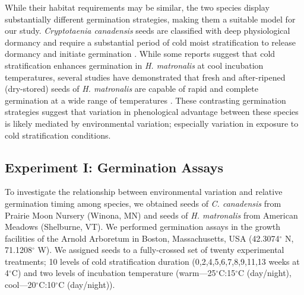 \documentclass{article}[11pt]
\begin{document}
While their habitat requirements may be similar, the two species display substantially different germination strategies, making them a suitable model for our study. \textit{Cryptotaenia canadensis} seeds are classified with deep physiological dormancy and require a substantial period of cold moist stratification to release dormancy and initiate germination \citep{Baskin:1988um}. While some reports suggest that cold stratification enhances germination in \textit{H. matronalis} at cool incubation temperatures, several studies have demonstrated that fresh and after-ripened (dry-stored) seeds of \textit{H. matronalis} are capable of rapid and complete germination at a wide range of temperatures \citep{Susko:2008ut}. These contrasting germination strategies suggest that variation in phenological advantage between these species is likely mediated by environmental variation; especially variation in exposure to cold stratification conditions.

\subsection*{Experiment I: Germination Assays}
To investigate the relationship between environmental variation and relative germination timing among species, we obtained seeds of \textit{C. canadensis} from Prairie Moon Nursery (Winona, MN) and seeds of \textit{H. matronalis} from American Meadows (Shelburne, VT). We performed germination assays in the growth facilities of the Arnold Arboretum in Boston, Massachusetts, USA (42.3074$^{\circ}$ N, 71.1208$^{\circ}$ W). We assigned seeds to a fully-crossed set of twenty experimental treatments; 10 levels of cold stratification duration (0,2,4,5,6,7,8,9,11,13 weeks at 4$^{\circ}$C) and two levels of incubation temperature (warm---25$^{\circ}$C:15$^{\circ}$C (day/night), cool---20$^{\circ}$C:10$^{\circ}$C (day/night)).
\end{document}
